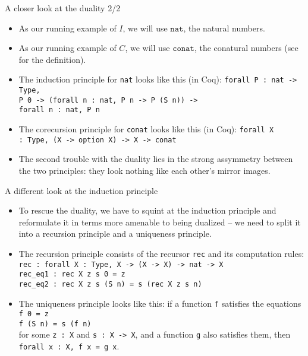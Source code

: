 \documentclass{beamer}
\begin{document}
\begin{frame}{A closer look at the duality 2/2}
\begin{itemize}
  \item As our running example of $I$, we will use $\texttt{nat}$, the natural numbers.
  \item As our running example of $C$, we will use $\texttt{conat}$, the conatural numbers (see \href{https://github.com/wkolowski/Seminar-Bisimulation-and-Coinduction/blob/master/Duality.v}{\color{blue}{here}} for the definition).
  \item The induction principle for \texttt{nat} looks like this (in Coq): \texttt{forall P :\ nat -> Type, \\ P 0 -> (forall n :\ nat, P n -> P (S n)) -> \\ forall n :\ nat, P n}
  \item The corecursion principle for \texttt{conat} looks like this (in Coq): \texttt{forall X :\ Type, (X -> option X) -> X -> conat}
  \item The second trouble with the duality lies in the strong assymmetry between the two principles: they look nothing like each other's mirror images.
\end{itemize}
\end{frame}

\begin{frame}{A different look at the induction principle}
\begin{itemize}
	\item To rescue the duality, we have to squint at the induction principle and reformulate it in terms more amenable to being dualized -- we need to split it into a recursion principle and a uniqueness principle.
	\item The recursion principle consists of the recursor \texttt{rec} and its computation rules: \\
	\texttt{rec :\ forall X :\ Type, X -> (X -> X) -> nat -> X} \\
	\texttt{rec\_eq1 :\ rec X z s 0 = z} \\
	\texttt{rec\_eq2 :\ rec X z s (S n) = s (rec X z s n)}
	\item The uniqueness principle looks like this: if a function \texttt{f} satisfies the equations \\
	\texttt{f 0 = z} \\
	\texttt{f (S n) = s (f n)} \\
	for some \texttt{z :\ X} and \texttt{s :\ X -> X}, and a function \texttt{g} also satisfies them, then \texttt{forall x :\ X, f x = g x}.
\end{itemize}
\end{frame}
\end{document}
